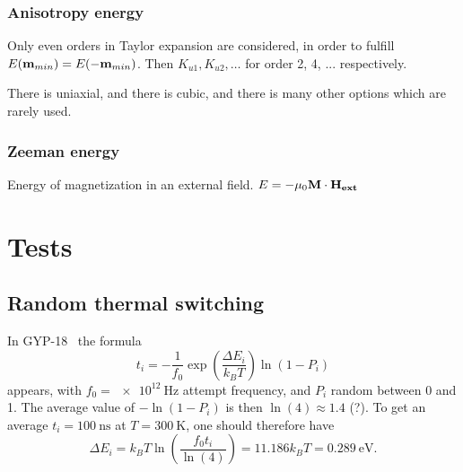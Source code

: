 \documentclass[10pt,a4paper]{article}
\begin{document}
	\subsubsection{Anisotropy energy}
	Only even orders in Taylor expansion are considered, in order to fulfill $E(\vb{m}_{min}) = E(-\vb{m}_{min})$. Then $K_{u1}, K_{u2}, \dots$ for order 2, 4, ... respectively.
	
	There is uniaxial, and there is cubic, and there is many other options which are rarely used.
	
	\subsubsection{Zeeman energy}
	Energy of magnetization in an external field.
	$E = -\mu_0 \vb{M} \cdot \vb{H_{ext}}$
	
	\section{Tests}
	\subsection{Random thermal switching}
	In GYP-18~\cite{GYP-18} the formula
	\begin{equation}
	    t_i = -\frac{1}{f_0} \exp(\frac{\Delta E_i}{k_B T}) \ln(1-P_i)
	\end{equation}
	appears, with $f_0 = \SI{e12}{\hertz}$ attempt frequency, and $P_i$ random between 0 and 1. The average value of $-\ln(1-P_i)$ is then $\ln(4) \approx 1.4$ (?). To get an average $t_i = \SI{100}{\nano\second}$ at $T=\SI{300}{\kelvin}$, one should therefore have
	\begin{equation}
	    \Delta E_i = k_B T \ln(\frac{f_0 t_i}{\ln(4)}) = 11.186 k_B T = \SI{0.289}{\electronvolt} \mathrm{.}
	\end{equation}
	
	\newpage
	
	
\end{document}

